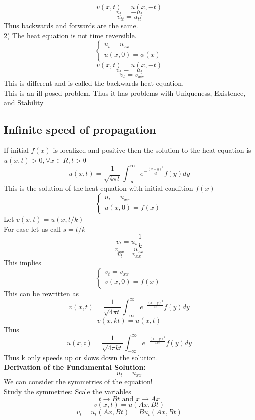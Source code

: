 \documentclass{article}
\begin{document}
$$ v(x,t) = u(x,-t)$$
$$ v_t = -u_t$$
$$ v_{tt} = u_{tt}$$
Thus backwards and forwards are the same.\\
2) The heat equation is not time reversible.\\
$$ \begin{cases}
    u_t = u_{xx}\\
    u(x,0) = \phi(x)
\end{cases}$$
$$ v(x,t) = u(x,-t)$$
$$ v_t = -u_t$$
$$ -v_t = v_{xx}$$
This is different and is called the backwards heat equation.\\
This is an ill posed problem. Thus it has problems with Uniqueness, Existence, and Stability\\
\subsection*{Infinite speed of propagation}
If initial $f(x)$ is localized and positive then the solution to the heat equation is $u(x,t) > 0, \forall x \in R, t > 0$\\
$$ u(x,t) = \frac{1}{\sqrt{4\pi t}} \int_{-\infty}^{\infty} e^{-\frac{(x-y)^2}{4t}} f(y) dy$$
This is the solution of the heat equation with initial condition $f(x)$\\
$$ \begin{cases}
    u_t = u_{xx}\\
    u(x,0) = f(x)
\end{cases}$$
Let $v(x,t) = u(x,t/k)$\\
For ease let us call $s = t/k$\\
$$ v_t = u_s \frac{1}{k}$$
$$ v_{xx} = u_{xx}$$
$$ v_t = v_{xx}$$
This implies 
$$ \begin{cases}
    v_t = v_{xx}\\
    v(x,0) = f(x)
\end{cases} $$
This can be rewritten as 
$$ v(x,t) = \frac{1}{\sqrt{4\pi t}} \int_{-\infty}^{\infty} e^{-\frac{(x-y)^2}{4t}} f(y) dy$$
$$ v(x,kt) = u(x,t)$$
Thus 
$$ u(x,t) = \frac{1}{\sqrt{4\pi kt}} \int_{-\infty}^{\infty} e^{-\frac{(x-y)^2}{4kt}} f(y) dy$$
Thus k only speeds up or slows down the solution.\\
\textbf{Derivation of the Fundamental Solution:} \\
$$ u_t = u_{xx}$$
We can consider the symmetries of the equation! \\
Study the symmetries: Scale the variables\\
$$ t \to Bt \text{ and } x \to Ax$$
$$ v(x,t) = u(Ax, Bt)$$
$$ v_t = u_t(Ax, Bt) = B u_t(Ax, Bt)$$
\end{document}
